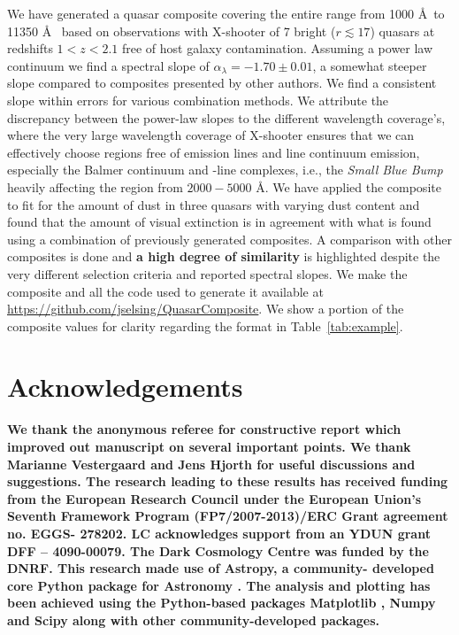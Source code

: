 \documentclass{aa}    %
\newcommand{\Tab}[1]{Table~\ref{tab:#1}}
\newcommand{\tab}[1]{\Tab{#1}}
\newcommand{\sectlabel}[1]{\label{sect:#1}}
\newcommand{\feii}{\ion{Fe}{ii}}
\begin{document}
We have generated a quasar composite covering the entire range from 1000 \AA~to
11350 \AA~ based on observations with X-shooter of 7 bright ($r \lesssim 17$)
quasars at redshifts $1 < z < 2.1$ free of host galaxy contamination. Assuming a
power law continuum we find a spectral slope of $\alpha_\lambda = -1.70 \pm 0.01$, a
somewhat steeper slope compared to composites presented by other authors. We
find a consistent slope within errors for various combination methods. We
attribute the discrepancy between the power-law slopes to the different wavelength
coverage's, where the very large wavelength coverage of X-shooter ensures that we
can effectively choose regions free of emission lines and line continuum
emission, especially the Balmer continuum and \feii-line complexes, i.e., the
\textit{Small Blue Bump} heavily affecting the region from $2000 - 5000$ \AA. We
have applied the composite to fit for the amount of dust in three quasars with
varying dust content and found that the amount of visual extinction is in
agreement with what is found using a combination of previously generated
composites. A comparison with other composites is done and \textbf{a high degree of similarity} is highlighted despite the very different selection criteria and
reported spectral slopes.
We make the composite and all the code used to generate it available at
\url{https://github.com/jselsing/QuasarComposite}. We show a portion of the
composite values for clarity regarding the format in \tab{example}.

 


\section{Acknowledgements}  \sectlabel{Acknowledgements}

\textbf{We thank the anonymous referee for constructive report which improved out manuscript on several important points. We thank Marianne Vestergaard and Jens Hjorth for useful discussions and suggestions. The research leading to these results has received funding from the European Research Council under the European Union’s Seventh Framework Program (FP7/2007-2013)/ERC Grant agreement no. EGGS- 278202. LC acknowledges support from an YDUN grant DFF – 4090-00079. The Dark Cosmology Centre was funded by the DNRF. This research made use of Astropy, a community- developed core Python package for Astronomy \citep{TheAstropyCollaboration2013}. The analysis and plotting has been achieved using the Python-based packages Matplotlib \citep{Hunter2007}, Numpy and Scipy \citep{VanderWalt2011} along with other community-developed packages.}
\end{document}
